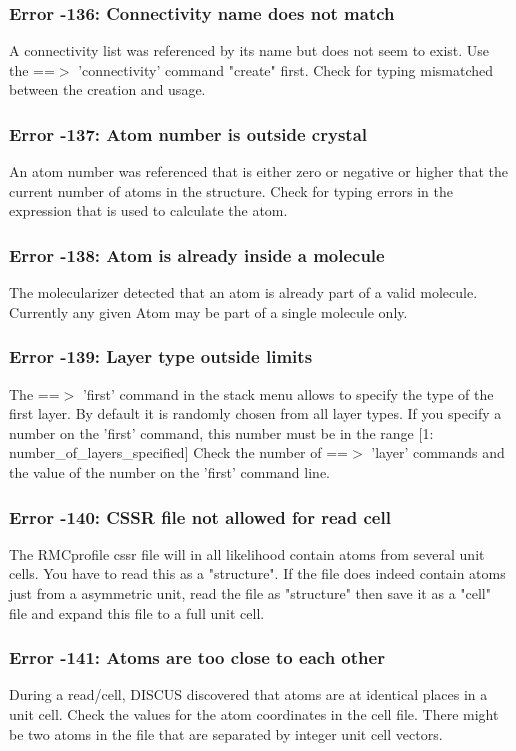 \subsubsection{Error -136: Connectivity name does not match}
\par
A connectivity list was referenced by its name but 
does not seem to exist. Use the ==$> $ 'connectivity' 
command "create" first. 
Check for typing mismatched between the creation and usage. 
\subsubsection{Error -137: Atom number is outside crystal}
\par
An atom number was referenced that is either zero or 
negative or higher that the current number of atoms 
in the structure. 
Check for typing errors in the expression that is used 
to calculate the atom. 
\subsubsection{Error -138: Atom is already inside a molecule}
\par
The molecularizer detected that an atom is already part 
of a valid molecule. Currently any given Atom may be part 
of a single molecule only. 
\subsubsection{Error -139: Layer type outside limits}
\par
The ==$> $ 'first' command in the stack menu allows to specify 
the type of the first layer. By default it is randomly 
chosen from all layer types. If you specify a number on the 
'first' command, this number must be in the range 
[1: number\_of\_layers\_specified] 
Check the number of ==$> $ 'layer' commands and the value of 
the number on the 'first' command line. 
\subsubsection{Error -140: CSSR file not allowed for read cell}
\par
The RMCprofile cssr file will in all likelihood contain 
atoms from several unit cells. You have to read this as 
a "structure". If the file does indeed contain atoms 
just from a asymmetric unit, read the file as "structure" 
then save it as a "cell" file and expand this file to a 
full unit cell. 
\subsubsection{Error -141: Atoms are too close to each other}
\par
During a read/cell, DISCUS discovered that atoms are at 
identical places in a unit cell. 
Check the values for the atom coordinates in the cell file. 
There might be two atoms in the file that are separated 
by integer unit cell vectors. 
